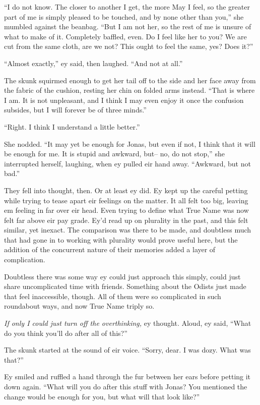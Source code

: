 ``I do not know. The closer to another I get, the more May I feel, so the greater part of me is simply pleased to be touched, and by none other than you,'' she mumbled against the beanbag. ``But I am not her, so the rest of me is unsure of what to make of it. Completely baffled, even. Do I feel like her to you? We are cut from the same cloth, are we not? This ought to feel the same, yes? Does it?''

``Almost exactly,'' ey said, then laughed. ``And not at all.''

The skunk squirmed enough to get her tail off to the side and her face away from the fabric of the cushion, resting her chin on folded arms instead. ``That is where I am. It is not unpleasant, and I think I may even enjoy it once the confusion subsides, but I will forever be of three minds.''

``Right. I think I understand a little better.''

She nodded. ``It may yet be enough for Jonas, but even if not, I think that it will be enough for me. It is stupid and awkward, but-- no, do not stop,'' she interrupted herself, laughing, when ey pulled eir hand away. ``Awkward, but not bad.''

They fell into thought, then. Or at least ey did. Ey kept up the careful petting while trying to tease apart eir feelings on the matter. It all felt too big, leaving em feeling in far over eir head. Even trying to define what True Name was now felt far above eir pay grade. Ey'd read up on plurality in the past, and this felt similar, yet inexact. The comparison was there to be made, and doubtless much that had gone in to working with plurality would prove useful here, but the addition of the concurrent nature of their memories added a layer of complication.

Doubtless there was some way ey could just approach this simply, could just share uncomplicated time with friends. Something about the Odists just made that feel inaccessible, though. All of them were so complicated in such roundabout ways, and now True Name triply so.

\emph{If only I could just turn off the overthinking,} ey thought. Aloud, ey said, ``What do you think you'll do after all of this?''

The skunk started at the sound of eir voice. ``Sorry, dear. I was dozy. What was that?''

Ey smiled and ruffled a hand through the fur between her ears before petting it down again. ``What will you do after this stuff with Jonas? You mentioned the change would be enough for you, but what will that look like?''

